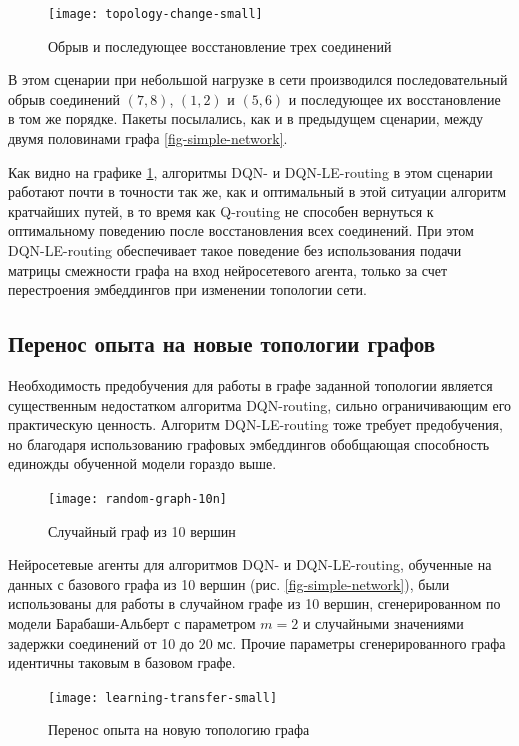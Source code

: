 \documentclass[specification,annotation,times]{itmo-student-thesis}
\theoremstyle{definition}
\begin{document}
\begin{figure}[!h]
  \caption{Обрыв и последующее восстановление трех соединений}\label{experiments:network:topology-change-small}
  \centering
  \texttt{[image: topology-change-small]}
\end{figure}

В этом сценарии при небольшой нагрузке в сети производился последовательный
обрыв соединений $(7, 8)$, $(1, 2)$ и $(5, 6)$ и последующее их восстановление в том
же порядке. Пакеты посылались, как и в предыдущем сценарии, между двумя
половинами графа \ref{fig-simple-network}.

Как видно на графике \ref{experiments:network:topology-change-small}, алгоритмы
DQN- и DQN-LE-routing в этом сценарии работают почти в точности так же, как и
оптимальный в этой ситуации алгоритм кратчайших путей, в то время как Q-routing
не способен вернуться к оптимальному поведению после восстановления всех
соединений. При этом DQN-LE-routing обеспечивает такое поведение без
использования подачи матрицы смежности графа на вход нейросетевого агента,
только за счет перестроения эмбеддингов при изменении топологии сети.

\subsection{Перенос опыта на новые топологии графов}

Необходимость предобучения для работы в графе заданной топологии является
существенным недостатком алгоритма DQN-routing, сильно ограничивающим его
практическую ценность. Алгоритм DQN-LE-routing тоже требует предобучения, но
благодаря использованию графовых эмбеддингов обобщающая способность единожды
обученной модели гораздо выше.

\begin{figure}[!h]
  \caption{Случайный граф из 10 вершин}\label{fig-random-net-10n}
  \centering
  \texttt{[image: random-graph-10n]}
\end{figure}

Нейросетевые агенты для алгоритмов DQN- и DQN-LE-routing, обученные на данных с
базового графа из 10 вершин (рис. \ref{fig-simple-network}), были использованы
для работы в случайном графе из 10 вершин, сгенерированном по модели
Барабаши-Альберт с параметром $m = 2$ и случайными значениями задержки
соединений от 10 до 20 мс. Прочие параметры сгенерированного графа идентичны
таковым в базовом графе. 

\begin{figure}[!h]
  \caption{Перенос опыта на новую топологию графа}\label{experiments:network:transfer-small}
  \centering
  \texttt{[image: learning-transfer-small]}
\end{figure}
\end{document}

